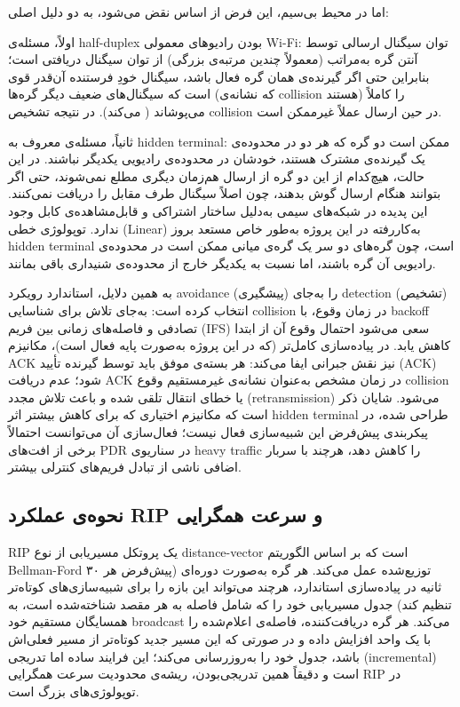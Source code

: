 \documentclass{article}
\begin{document}
	اما در محیط بی‌سیم، این فرض از اساس نقض می‌شود، به دو دلیل اصلی:
	
	اولاً، مسئله‌ی half-duplex بودن رادیوهای معمولی Wi-Fi: توان سیگنال ارسالی توسط آنتن گره به‌مراتب (معمولاً چندین مرتبه‌ی بزرگی) از توان سیگنال دریافتی است؛ بنابراین حتی اگر گیرنده‌ی همان گره فعال باشد، سیگنال خودِ فرستنده آن‌قدر قوی است که سیگنال‌های ضعیف دیگر گره‌ها (که نشانه‌ی collision هستند) را کاملاً می‌پوشاند ( می‌کند). در نتیجه تشخیص collision در حین ارسال عملاً غیرممکن است.
	
	ثانیاً، مسئله‌ی معروف به hidden terminal: ممکن است دو گره که هر دو در محدوده‌ی یک گیرنده‌ی مشترک هستند، خودشان در محدوده‌ی رادیویی یکدیگر نباشند. در این حالت، هیچ‌کدام از این دو گره از ارسال هم‌زمان دیگری مطلع نمی‌شوند، حتی اگر بتوانند هنگام ارسال گوش بدهند، چون اصلاً سیگنال طرف مقابل را دریافت نمی‌کنند. این پدیده در شبکه‌های سیمی به‌دلیل ساختار اشتراکی و قابل‌مشاهده‌ی کابل وجود ندارد. توپولوژی خطی (Linear) به‌کاررفته در این پروژه به‌طور خاص مستعد بروز hidden terminal است، چون گره‌های دو سر یک گره‌ی میانی ممکن است در محدوده‌ی رادیویی آن گره باشند، اما نسبت به یکدیگر خارج از محدوده‌ی شنیداری باقی بمانند.
	
	به همین دلایل، استاندارد  رویکرد avoidance (پیشگیری) را به‌جای detection (تشخیص) انتخاب کرده است: به‌جای تلاش برای شناسایی collision در زمان وقوع، با backoff تصادفی و فاصله‌های زمانی بین فریم (IFS) سعی می‌شود احتمال وقوع آن از ابتدا کاهش یابد. در پیاده‌سازی کامل‌تر  (که در این پروژه به‌صورت پایه فعال است)، مکانیزم ACK نیز نقش جبرانی ایفا می‌کند: هر بسته‌ی موفق باید توسط گیرنده تأیید (ACK) شود؛ عدم دریافت ACK در زمان مشخص به‌عنوان نشانه‌ی غیرمستقیم وقوع collision یا خطای انتقال تلقی شده و باعث تلاش مجدد (retransmission) می‌شود. شایان ذکر است که مکانیزم اختیاری  که برای کاهش بیشتر اثر hidden terminal طراحی شده، در پیکربندی پیش‌فرض این شبیه‌سازی فعال نیست؛ فعال‌سازی آن می‌توانست احتمالاً برخی از افت‌های PDR در سناریوی heavy traffic را کاهش دهد، هرچند با سربار اضافی ناشی از تبادل فریم‌های کنترلی بیشتر.
	
	\subsection{نحوه‌ی عملکرد RIP و سرعت همگرایی}
	RIP یک پروتکل مسیریابی از نوع distance-vector است که بر اساس الگوریتم Bellman-Ford توزیع‌شده عمل می‌کند. هر گره به‌صورت دوره‌ای (پیش‌فرض هر ۳۰ ثانیه در پیاده‌سازی استاندارد، هرچند  می‌تواند این بازه را برای شبیه‌سازی‌های کوتاه‌تر تنظیم کند) جدول مسیریابی خود را که شامل فاصله  به هر مقصد شناخته‌شده است، به همسایگان مستقیم خود broadcast می‌کند. هر گره دریافت‌کننده، فاصله‌ی اعلام‌شده را با یک واحد افزایش داده و در صورتی که این مسیر جدید کوتاه‌تر از مسیر فعلی‌اش باشد، جدول خود را به‌روزرسانی می‌کند؛ این فرایند ساده اما تدریجی (incremental) است و دقیقاً همین تدریجی‌بودن، ریشه‌ی محدودیت سرعت همگرایی RIP در توپولوژی‌های بزرگ است.
	
\end{document}
